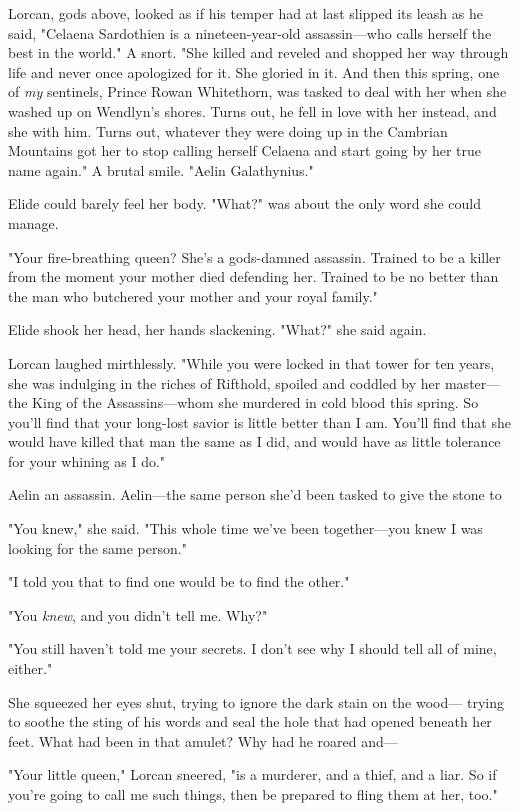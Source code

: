 Lorcan, gods above, looked as if his temper had at last slipped its leash as he said, "Celaena Sardothien is a nineteen-year-old assassin---who calls herself the best in the world." A snort. "She killed and reveled and shopped her way through life and never once apologized for it. She gloried in it. And then this spring, one of
\emph{my} sentinels, Prince Rowan Whitethorn, was tasked to deal with her when she washed up on Wendlyn's shores. Turns out, he fell in love with her instead, and she with him. Turns out, whatever they were doing up in the Cambrian Mountains got her to stop calling herself Celaena and start going by her true name again." A brutal smile. "Aelin Galathynius."

Elide could barely feel her body. "What?" was about the only word she could manage.

"Your fire-breathing queen? She's a gods-damned assassin. Trained to be a killer from the moment your mother died defending her. Trained to be no better than the man who butchered your mother and your royal family."

Elide shook her head, her hands slackening. "What?" she said again.

Lorcan laughed mirthlessly. "While you were locked in that tower for ten years, she was indulging in the riches of Rifthold, spoiled and coddled by her master---the King of the Assassins---whom she murdered in cold blood this spring. So you'll find that your long-lost savior is little better than I am. You'll find that she would have killed that man the same as I did, and would have as little tolerance for your whining as I do."

Aelin  an assassin. Aelin---the same person she'd been tasked to give the stone to 

"You knew," she said. "This whole time we've been together---you knew I was looking for the same person."

"I told you that to find one would be to find the other."

"You \emph{knew}, and you didn't tell me. Why?"

"You still haven't told me your secrets. I don't see why I should tell all of mine, either."

She squeezed her eyes shut, trying to ignore the dark stain on the wood--- trying to soothe the sting of his words and seal the hole that had opened beneath her feet. What had been in that amulet? Why had he roared and---

"Your little queen," Lorcan sneered, "is a murderer, and a thief, and a liar. So if you're going to call me such things, then be prepared to fling them at her, too."

